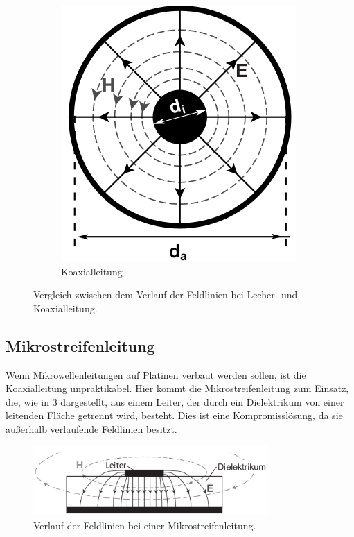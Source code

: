 \documentclass[
	a4paper,
	12pt,
	pagesize,
	ngerman
]{scrartcl}
\begin{document}
\begin{figure}[H]
\begin{subfigure}[b]{0.40\textwidth}
            \includegraphics[width=\textwidth]{img/koaxial}
            \caption{
						Koaxialleitung
						}
            \label{fig_koaxial}
        \end{subfigure}

        \caption{Vergleich zwischen dem Verlauf der Feldlinien bei Lecher- und Koaxialleitung. \cite{Anleitung}}
				\label{fig_lecherkoaxial}
	\end{figure}


	\subsection{Mikrostreifenleitung}

	Wenn Mikrowellenleitungen auf Platinen verbaut werden sollen, ist die Koaxialleitung unpraktikabel.
	Hier kommt die Mikrostreifenleitung zum Einsatz, die, wie in \cref{fig_mikrostreifen} dargestellt, aus einem Leiter, der durch ein Dielektrikum von einer leitenden Fläche getrennt wird, besteht.
	Dies ist eine Kompromisslösung, da sie außerhalb verlaufende Feldlinien besitzt.

	\begin{figure}[H]
		\includegraphics[width=0.8\textwidth]{img/mirkostreifen}
		\centering
		\caption{
			Verlauf der Feldlinien bei einer Mikrostreifenleitung. \cite{Anleitung}
		}
		\label{fig_mikrostreifen}
		\centering
	\end{figure}
\end{document}
